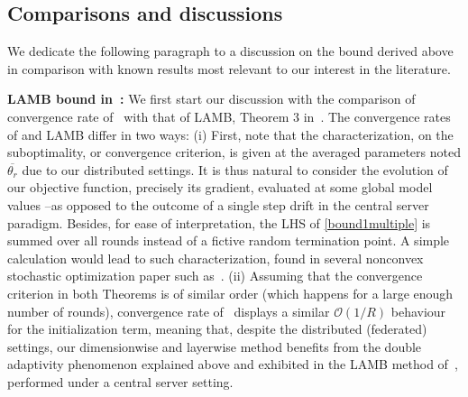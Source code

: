 \documentclass[11pt]{article}
\begin{document}
\subsection{Comparisons and discussions}

We dedicate the following paragraph to a discussion on the bound derived above in comparison with known results most relevant to our interest in the literature.

\vspace{0.05in}
\textbf{LAMB bound in~\citet{you2019large}: }
We first start our discussion with the comparison of convergence rate of \algo\ with that of LAMB, Theorem 3 in~\citep{you2019large}. 
The convergence rates of \algo and LAMB differ in two ways: 
(i) First, note that the characterization, on the suboptimality, or convergence criterion, is given at the averaged parameters noted $\overline{\theta_r}$ due to our distributed settings. 
It is thus natural to consider the evolution of our objective function, precisely its gradient, evaluated at some global model values --as opposed to the outcome of a single step drift in the central server paradigm. 
Besides, for ease of interpretation, the LHS of \eqref{bound1multiple} is summed over all rounds instead of a fictive random termination point. A simple calculation would lead to such characterization, found in several nonconvex stochastic optimization paper such as~\citep{ghadimi2013stochastic}.
(ii)  Assuming that the convergence criterion in both Theorems is of similar order (which happens for a large enough number of rounds), convergence rate of \algo\ displays a similar $\mathcal{O}(1/R)$ behaviour for the initialization term, meaning that, despite the distributed (federated) settings, our dimensionwise and layerwise method benefits from the double adaptivity phenomenon explained above and exhibited in the LAMB method of~\citep{you2019large}, performed under a central server setting.
\end{document}
